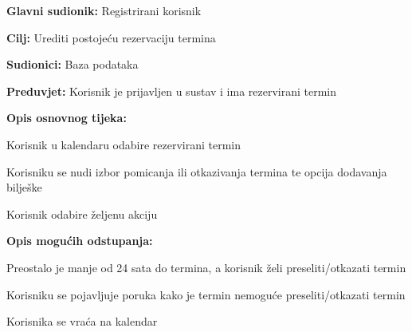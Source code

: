 \noindent {}
\begin{packed_item}
	
	\item \textbf{Glavni sudionik: } Registrirani korisnik
	\item  \textbf{Cilj:} Urediti postojeću rezervaciju termina
	\item  \textbf{Sudionici:} Baza podataka
	\item  \textbf{Preduvjet:} Korisnik je prijavljen u sustav i ima rezervirani termin
	\item  \textbf{Opis osnovnog tijeka:}
	
	\item[] \begin{packed_enum}
		
		\item Korisnik u kalendaru odabire rezervirani termin
		\item Korisniku se nudi izbor pomicanja ili otkazivanja termina te opcija dodavanja bilješke
		\item Korisnik odabire željenu akciju
	\end{packed_enum}
	
	\item  \textbf{Opis mogućih odstupanja:}
	
	\item[] \begin{packed_item}
		
		\item[2.a] Preostalo je manje od 24 sata do termina, a korisnik želi preseliti/otkazati termin
		\item[] \begin{packed_enum}
			
			\item Korisniku se pojavljuje poruka kako je termin nemoguće preseliti/otkazati termin
			\item Korisnika se vraća na kalendar
			
		\end{packed_enum}
		
	\end{packed_item}
\end{packed_item}

